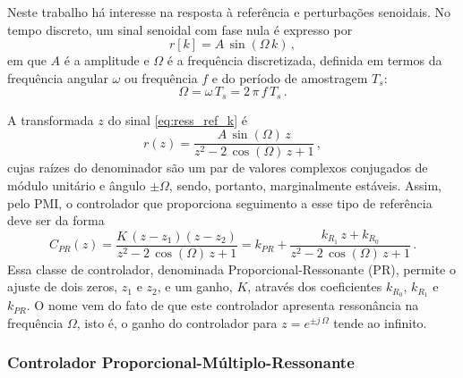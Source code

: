 \documentclass[repeatfields,oneside]{tcc}
\newcommand{\mycdot}{ \, }
\newcommand{\myC}[2][]{ C_{#1} \left( #2 \right) }
\begin{document}
Neste trabalho há interesse na resposta à referência e perturbações senoidais.
No tempo discreto, um sinal senoidal com fase nula é expresso por
\begin{equation}\label{eq:ress_ref_k}
    r[k] = A \mycdot \sin \left( \Omega \mycdot k \right)
    \,,
\end{equation}
em que $A$ é a amplitude e $\Omega$ é a frequência discretizada, definida em termos da frequência angular $\omega$ ou frequência $f$ e do período de amostragem $T_s$:
\begin{equation}\label{eq:ress_Omega}
    \Omega = \omega \mycdot T_s = 2 \mycdot \pi \mycdot f \mycdot T_s
    \,.
\end{equation}

A transformada $z$ do sinal \eqref{eq:ress_ref_k} é
\begin{equation}\label{eq:ress_ref_z}
    r(z) = \dfrac{ A \mycdot \sin \left( \Omega \right) \mycdot z }
                 { z^2 - 2 \mycdot \cos \left( \Omega \right) \mycdot z + 1 }
    \,,
\end{equation}
cujas raízes do denominador são um par de valores complexos conjugados de módulo unitário e ângulo $\pm\Omega$, sendo, portanto, marginalmente estáveis.
Assim, pelo PMI, o controlador que proporciona seguimento a esse tipo de referência deve ser da forma
\begin{equation}\label{eq:ress_C_PR}
    \myC[PR]{z}
    = \dfrac{ K \mycdot (z - z_1) (z - z_2) }
            { z^2 - 2 \mycdot \cos \left( \Omega \right) \mycdot z + 1 }
    = k_{PR} + \dfrac{ k_{R_1} \mycdot z + k_{R_0} }
                  { z^2 - 2 \mycdot \cos \left( \Omega \right) \mycdot z + 1 }
    \,.
\end{equation}
Essa classe de controlador, denominada Proporcional-Ressonante (PR), permite o ajuste de dois zeros, $z_1$ e $z_2$, e um ganho, $K$, através dos coeficientes $k_{R_0}$, $k_{R_1}$ e $k_{PR}$.
O nome vem do fato de que este controlador apresenta ressonância na frequência $\Omega$, isto é, o ganho do controlador para $z = e^{\pm j \mycdot \Omega}$ tende ao infinito.

\subsubsection{Controlador Proporcional-Múltiplo-Ressonante}\label{sec:controle_PMR}
\end{document}
